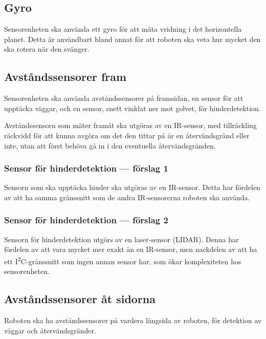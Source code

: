 \documentclass[a4paper,titlepage,12pt]{article}
\newcommand{\itc}{I\textsuperscript{2}C}
\begin{document}
    \subsection{Gyro}
    
    Sensorenheten ska använda ett gyro för att mäta vridning i det horizontella
    planet. Detta är användbart bland annat för att roboten ska veta hur mycket
    den ska rotera när den svänger.
    
    \subsection{Avståndssensorer fram}
    
    Sensorenheten ska använda avståndssensorer på framsidan, en sensor för att
    upptäcka väggar, och en sensor, snett vinklat ner mot golvet, för hinderdetektion. 

    Avståndssensorn som mäter framåt ska utgöras av en IR-sensor, med
    tillräckling räckvidd för att kunna avgöra om det den tittar på är en
    återvändsgränd eller inte, utan att först behöva gå in i den eventuella
    återvändsgränden.

    \subsubsection{Sensor för hinderdetektion --- förslag 1}

    Sensorn som ska upptäcka hinder ska utgöras av en IR-sensor. Detta
    har fördelen av att ha samma gränssnitt som de andra IR-sensorerna roboten
    ska använda.

    \subsubsection{Sensor för hinderdetektion --- förslag 2}

    Sensorn för hinderdetektion utgörs av en laser-sensor (LIDAR). Denna har
    fördelen av att vara mycket mer exakt än en IR-sensor, men nackdelen av att
    ha ett \itc{}-gränssnitt som ingen annan sensor har, som ökar
    komplexiteten hos sensorenheten.

    \subsection{Avståndssensorer åt sidorna}
    Roboten ska ha avståndssensorer på vardera långsida av roboten, för
    detektion av väggar och återvändsgränder.
\end{document}
